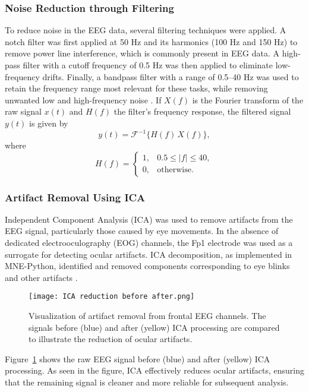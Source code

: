 \documentclass[pdflatex,sn-mathphys-num]{sn-jnl}%
\theoremstyle{thmstyleone}%
\theoremstyle{thmstyletwo}%
\theoremstyle{thmstylethree}%
\begin{document}
\subsubsection{Noise Reduction through Filtering}\label{subsec5}

To reduce noise in the EEG data, several filtering techniques were applied. A notch filter was first applied at 50 Hz and its harmonics (100 Hz and 150 Hz) to remove power line interference, which is commonly present in EEG data. A high-pass filter with a cutoff frequency of 0.5 Hz was then applied to eliminate low-frequency drifts. Finally, a bandpass filter with a range of 0.5–40 Hz was used to retain the frequency range most relevant for these tasks, while removing unwanted low and high-frequency noise \cite{Widmann2015}.  If \(X(f)\) is the Fourier transform of the raw signal \(x(t)\) and \(H(f)\) the filter’s frequency response, the filtered signal \(y(t)\) is given by
\[
  y(t)
  = \mathcal{F}^{-1}\bigl\{H(f)\,X(f)\bigr\},
\]
where
\[
  H(f) =
    \begin{cases}
      1, & 0.5 \le |f| \le 40,\\
      0, & \text{otherwise.}
    \end{cases}
\]


\subsubsection{Artifact Removal Using ICA}\label{subsec6}

Independent Component Analysis (ICA) was used to remove artifacts from the EEG signal, particularly those caused by eye movements. In the absence of dedicated electrooculography (EOG) channels, the Fp1 electrode was used as a surrogate for detecting ocular artifacts. ICA decomposition, as implemented in MNE-Python, identified and removed components corresponding to eye blinks and other artifacts \cite{Jung2000, Delorme2004}. 

\begin{figure}[H]
    \centering
    \texttt{[image: ICA reduction before after.png]}
    \caption{Visualization of artifact removal from frontal EEG channels. The signals before (blue) and after (yellow) ICA processing are compared to illustrate the reduction of ocular artifacts.}
    \label{fig:ICA reduction before after}
\end{figure}

Figure~\ref{fig:ICA reduction before after} shows the raw EEG signal before (blue) and after (yellow) ICA processing. As seen in the figure, ICA effectively reduces ocular artifacts, ensuring that the remaining signal is cleaner and more reliable for subsequent analysis.
\end{document}
